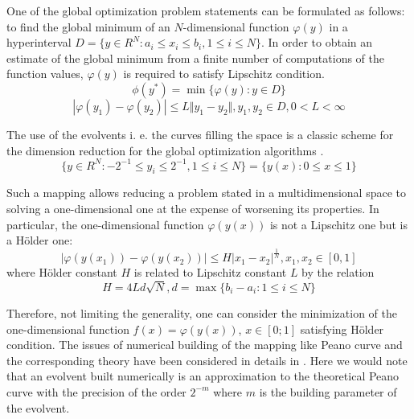 \documentclass[procedia]{easychair}
\begin{document}
One of the global optimization problem statements can be formulated as follows:
to find the global minimum of an \(N\)-dimensional function \(\varphi(y)\) in a hyperinterval
\(D=\{y\in R^N:a_i\leqslant x_i\leqslant{b_i}, 1\leqslant{i}\leqslant{N}\}\).
In order to obtain an estimate of the global minimum from a finite number of computations
of the function values, \(\varphi(y)\) is required to satisfy Lipschitz condition.
\begin{displaymath}
\label{task}
\phi(y^*)=\min\{\varphi(y):y\in D\}
\end{displaymath}
\begin{displaymath}
\label{lip}
|\varphi(y_1)-\varphi(y_2)|\leqslant L\Vert y_1-y_2\Vert,y_1,y_2\in D,0<L<\infty
\end{displaymath}
\par
The use of the evolvents i. e. the curves filling the space is a classic scheme
for the dimension reduction for the global optimization algorithms \cite{strOptBook}.
\begin{displaymath}
\label{cube}
\lbrace y\in R^N:-2^{-1}\leqslant y_i\leqslant 2^{-1},1\leqslant i\leqslant N\rbrace=\{y(x):0\leqslant x\leqslant 1\}
\end{displaymath}
\par
Such a mapping allows reducing a problem stated in a multidimensional space to solving
a one-dimensional one at the expense of worsening its properties. In particular,
the one-dimensional function \(\varphi(y(x))\) is not a Lipschitz one but is a Hölder one:
\begin{displaymath}
\label{holder}
|\varphi(y(x_1))-\varphi(y(x_2))|\leqslant H{|x_1-x_2|}^{\frac{1}{N}},x_1,x_2\in[0,1]
\end{displaymath}
where Hölder constant \(H\) is related to Lipschitz constant \(L\) by the relation
\begin{displaymath}
H=4Ld\sqrt{N},d=\max\{b_i-a_i:1\leqslant i\leqslant N\}
\end{displaymath}
\par
Therefore, not limiting the generality, one can consider the minimization of the
one-dimensional function \(f(x)=\varphi(y(x))\), \(x\in[0;1]\) satisfying Hölder condition.
The issues of numerical building of the mapping like Peano curve and the corresponding
theory have been considered in details in \cite{strOptBook}. Here we would note that an evolvent
built numerically is an approximation to the theoretical Peano curve with the precision
of the order \(2^{-m}\) where \(m\) is the building parameter of the evolvent.
\end{document}
